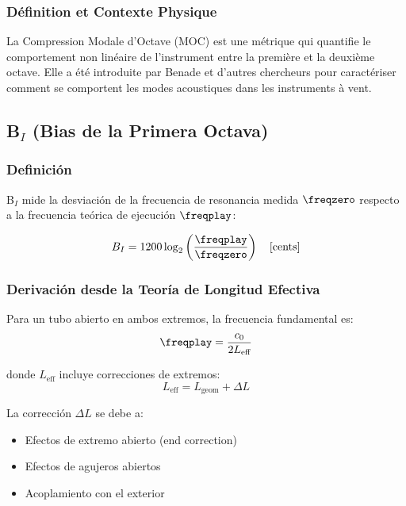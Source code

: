 \subsubsection{Définition et Contexte Physique}

La Compression Modale d'Octave (MOC) est une métrique qui quantifie le comportement non linéaire de l'instrument entre la première et la deuxième octave. Elle a été introduite par Benade et d'autres chercheurs pour caractériser comment se comportent les modes acoustiques dans les instruments à vent.


\subsection{B$_I$ (Bias de la Primera Octava)}

\subsubsection{Definición}

B$_I$ mide la desviación de la frecuencia de resonancia medida $\freqzero$ respecto a la frecuencia teórica de ejecución $\freqplay$:

\begin{equation}
B_I = 1200 \log_2\left(\frac{\freqplay}{\freqzero}\right) \quad \text{[cents]}
\label{eq:bi_def}
\end{equation}

\subsubsection{Derivación desde la Teoría de Longitud Efectiva}

Para un tubo abierto en ambos extremos, la frecuencia fundamental es:
\begin{equation}
\freqplay = \frac{c_0}{2 L_{\text{eff}}}
\end{equation}

donde $L_{\text{eff}}$ incluye correcciones de extremos:
\begin{equation}
L_{\text{eff}} = L_{\text{geom}} + \Delta L
\end{equation}

La corrección $\Delta L$ se debe a:
\begin{itemize}
    \item Efectos de extremo abierto (end correction)
    \item Efectos de agujeros abiertos
    \item Acoplamiento con el exterior
\end{itemize}

